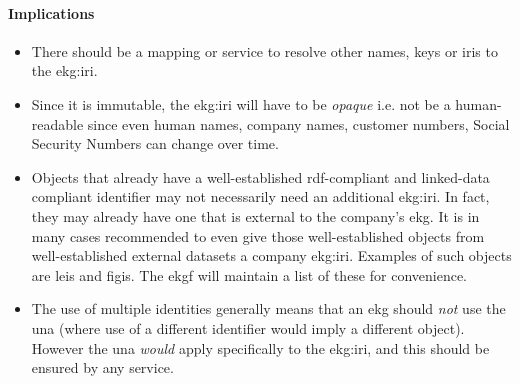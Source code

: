 \paragraph{Implications}

\begin{itemize}
    \item There should be a mapping or service to resolve other names, keys or \glspl{iri} to the \gls{ekg:iri}.
    \item Since it is immutable, the \gls{ekg:iri} will have to be \textit{opaque} i.e. not be a human-readable
          since even human names, company names, customer numbers, Social Security Numbers can change over time.
    \item Objects that already have a well-established \gls{rdf}-compliant and \gls{linked-data} compliant identifier
          may not necessarily need an additional \gls{ekg:iri}.
          In fact, they may already have one that is external to the company's \gls{ekg}.
          It is in many cases recommended to even give those well-established objects from well-established external
          datasets a company \gls{ekg:iri}. Examples of such objects are \glspl{lei} and \glspl{figi}.
          The \gls{ekgf} will maintain a list of these for convenience.
    \item The use of multiple identities generally means that an \gls{ekg} should \textit{not}
          use the \gls{una} (where use of a different identifier would imply a different object).
          However the \gls{una} \textit{would} apply specifically to the \gls{ekg:iri},
          and this should be ensured by any service.
\end{itemize}
  
